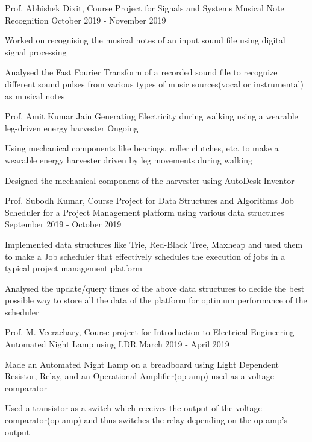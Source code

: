 
\begin{cventries}
  \cventry
    {Prof. Abhishek Dixit, Course Project for Signals and Systems}
    {Musical Note Recognition} %
    {} %
    {October 2019 - November 2019} %
    {
      \begin{cvitems} %
        \item {Worked on recognising the musical notes of an input sound file using digital signal processing}
        \item {Analysed the Fast Fourier Transform of a recorded sound file to recognize different sound pulses from various types of music sources(vocal or instrumental) as musical notes}
      \end{cvitems}
    }

  \cventry
    {Prof. Amit Kumar Jain}
    {Generating Electricity during walking using a wearable leg-driven energy harvester}
    {}
    {Ongoing}
    {
      \begin{cvitems}
        \item {Using mechanical components like bearings, roller clutches, etc. to make a wearable energy harvester driven by leg movements during walking}
        \item {Designed the mechanical component of the harvester using AutoDesk Inventor}
      \end{cvitems}
    }

  \cventry
    {Prof. Subodh Kumar, Course Project for Data Structures and Algorithms}
    {Job Scheduler for a Project Management platform using various data structures} %
    {}
    {September 2019 - October 2019} %
    {
      \begin{cvitems} %
      	\item {Implemented data structures like Trie, Red-Black Tree, Maxheap and used them to make a Job scheduler that effectively schedules the execution of jobs in a typical project management platform}
      	\item {Analysed the update/query times of the above data structures to decide the best possible way to store all the data of the platform for optimum performance of the scheduler}
      \end{cvitems}
    }

  \cventry
    {Prof. M. Veerachary, Course project for Introduction to Electrical Engineering}
    {Automated Night Lamp using LDR}
    {}
    {March 2019 - April 2019}
    {
      \begin{cvitems}
        \item {Made an Automated Night Lamp on a breadboard using Light Dependent Resistor, Relay, and an Operational Amplifier(op-amp) used as a voltage comparator}
        \item {Used a transistor as a switch which receives the output of the voltage comparator(op-amp) and thus switches the relay depending on the op-amp's output}
      \end{cvitems}
    }


\end{cventries}
